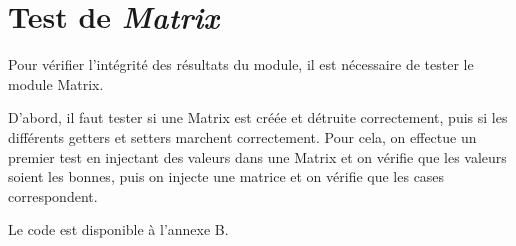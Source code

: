 \section{Test de \textit{Matrix}}

Pour vérifier l'intégrité des résultats du module, il est nécessaire de tester le module Matrix.

D'abord, il faut tester si une Matrix est créée et détruite correctement, puis si les différents getters et setters marchent correctement. Pour cela, on effectue un premier test en injectant des valeurs dans une Matrix et on vérifie que les valeurs soient les bonnes, puis on injecte une matrice et on vérifie que les cases correspondent.

Le code est disponible à l'annexe B.
